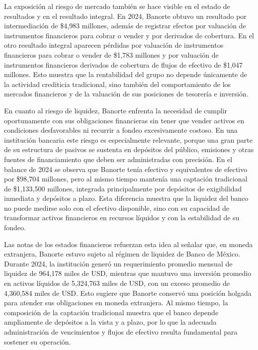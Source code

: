 La exposici\'on al riesgo de mercado tambi\'en se hace visible en el estado de resultados y en el resultado integral. En 2024, Banorte obtuvo un resultado por intermediaci\'on de \$4{,}983 millones, adem\'as de registrar efectos por valuaci\'on de instrumentos financieros para cobrar o vender y por derivados de cobertura. En el otro resultado integral aparecen p\'erdidas por valuaci\'on de instrumentos financieros para cobrar o vender de \$1{,}783 millones y por valuaci\'on de instrumentos financieros derivados de cobertura de flujos de efectivo de \$1{,}047 millones. Esto muestra que la rentabilidad del grupo no depende \'unicamente de la actividad crediticia tradicional, sino tambi\'en del comportamiento de los mercados financieros y de la valuaci\'on de sus posiciones de tesorer\'ia e inversi\'on.

En cuanto al riesgo de liquidez, Banorte enfrenta la necesidad de cumplir oportunamente con sus obligaciones financieras sin tener que vender activos en condiciones desfavorables ni recurrir a fondeo excesivamente costoso. En una instituci\'on bancaria este riesgo es especialmente relevante, porque una gran parte de su estructura de pasivos se sustenta en dep\'ositos del p\'ublico, emisiones y otras fuentes de financiamiento que deben ser administradas con precisi\'on. En el balance de 2024 se observa que Banorte ten\'ia efectivo y equivalentes de efectivo por \$98{,}704 millones, pero al mismo tiempo manten\'ia una captaci\'on tradicional de \$1{,}133{,}500 millones, integrada principalmente por dep\'ositos de exigibilidad inmediata y dep\'ositos a plazo. Esta diferencia muestra que la liquidez del banco no puede medirse solo con el efectivo disponible, sino con su capacidad de transformar activos financieros en recursos l\'iquidos y con la estabilidad de su fondeo.

Las notas de los estados financieros refuerzan esta idea al se\~nalar que, en moneda extranjera, Banorte estuvo sujeto al r\'egimen de liquidez de Banco de M\'exico. Durante 2024, la instituci\'on gener\'o un requerimiento promedio mensual de liquidez de 964{,}178 miles de USD, mientras que mantuvo una inversi\'on promedio en activos l\'iquidos de 5{,}324{,}763 miles de USD, con un exceso promedio de 4{,}360{,}584 miles de USD. Esto sugiere que Banorte conserv\'o una posici\'on holgada para atender sus obligaciones en moneda extranjera. Al mismo tiempo, la composici\'on de la captaci\'on tradicional muestra que el banco depende ampliamente de dep\'ositos a la vista y a plazo, por lo que la adecuada administraci\'on de vencimientos y flujos de efectivo resulta fundamental para sostener su operaci\'on.

